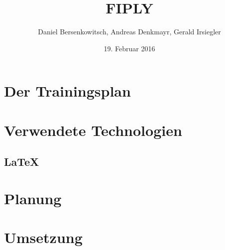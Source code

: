 \documentclass[a4paper, 12pt]{article}
\title{FIPLY}
\author{Daniel Bersenkowitsch, Andreas Denkmayr, Gerald Irsiegler}
\date{19. Februar 2016}
\begin{document}
\maketitle
\tableofcontents
\newpage

\newpage

\newpage

\newpage

\newpage


\newpage %


\newpage %
\section{Der Trainingsplan}


\newpage %
\section{Verwendete Technologien}

\newpage


\newpage
\subsection{LaTeX}







\newpage %
\section{Planung}

\newpage



\newpage %
\section{Umsetzung}

\newpage

\newpage

\newpage

\newpage

\newpage

\newpage

\newpage

\newpage

\newpage

\newpage

\newpage

\newpage

\newpage
%
%
\end{document}

